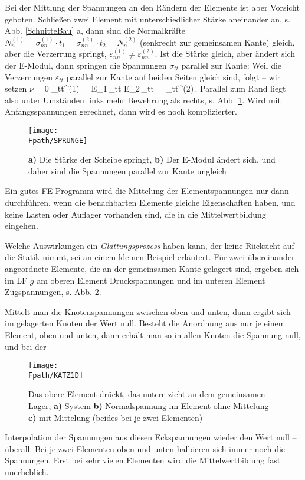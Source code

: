 {Bei der Mittlung der Spannungen an den R\"{a}ndern der Elemente ist aber Vorsicht geboten. Schlie{\ss}en zwei Element mit unterschiedlicher St\"{a}rke aneinander an, s. Abb. \ref{SchnitteBau} a, dann sind die Normalkr\"{a}fte $N_n^{(1)} = \sigma_{nn}^{(1)} \cdot t_1 = \sigma_{nn}^{(2)} \cdot t_2 = N_n^{(2)}$ (senkrecht zur gemeinsamen Kante) gleich, aber die Verzerrung springt, $\varepsilon_{nn}^{(1)} \neq \varepsilon_{nn}^{(2)}$. Ist die St\"{a}rke gleich, aber \"{a}ndert sich der E-Modul, dann springen die Spannungen $\sigma_{tt}$ parallel zur Kante: Weil die Verzerrungen $\varepsilon_{tt}$ parallel zur Kante auf beiden Seiten gleich sind, folgt -- wir setzen $\nu = 0$
\bfo
\sigma_{tt}^{(1)} = E_1\,\varepsilon_{tt} \neq E_2\,\varepsilon_{tt} =
\sigma_{tt}^{(2)}\,.
\efo
Parallel zum Rand liegt also unter Umst\"{a}nden links mehr Bewehrung als rechts, s. Abb. \ref{SprungE}. Wird mit Anfangsspannungen gerechnet, dann wird es noch komplizierter.

\begin{figure}[tbp] \centering
\if {} \sidecaption \fi
\texttt{[image: \\Fpath/SPRUNGE]}
\caption{{\bf a)} Die St\"{a}rke der Scheibe springt, {\bf b)} Der E-Modul \"{a}ndert sich, und
daher sind die Spannungen parallel zur Kante ungleich} \label{SprungE}
\end{figure}%
Ein gutes FE-Programm wird die Mittelung der Elementspannungen nur dann durchf\"{u}hren, wenn die benachbarten Elemente gleiche Eigenschaften haben, und keine Lasten oder Auflager vorhanden sind, die in die Mittelwertbildung eingehen.

Welche Auswirkungen ein {\em  Gl\"{a}ttungsprozess\/} haben kann, der keine R\"{u}cksicht auf die Statik nimmt, sei an einem kleinen Beispiel erl\"{a}utert. F\"{u}r zwei \"{u}bereinander angeordnete Elemente, die an der gemeinsamen Kante gelagert sind, ergeben sich im LF $g$ am oberen Element Druckspannungen und im unteren Element Zugspannungen, s. Abb. \ref{Katz1}.

Mittelt man die Knotenspannungen zwischen oben und unten, dann ergibt sich im gelagerten Knoten der Wert null. Besteht die Anordnung aus nur je einem Element, oben und unten, dann erh\"{a}lt man so in allen Knoten die Spannung null, und bei der
\begin{figure}[tbp] \centering
\if {} \sidecaption \fi
\texttt{[image: \\Fpath/KATZ1D]}
\caption{Das obere Element dr\"{u}ckt, das untere zieht an dem gemeinsamen Lager, {\bf a) }
System {\bf b)} Normalspannung im Element ohne Mittelung {\bf c) } mit Mittelung (beides
bei je zwei Elementen)} \label{Katz1}
\end{figure}%
Interpolation der Spannungen aus diesen Eckspannungen wieder den Wert null -- \"{u}berall. Bei je zwei Elementen oben und unten halbieren sich immer noch die Spannungen. Erst bei sehr vielen Elementen wird die Mittelwertbildung fast unerheblich.

}
